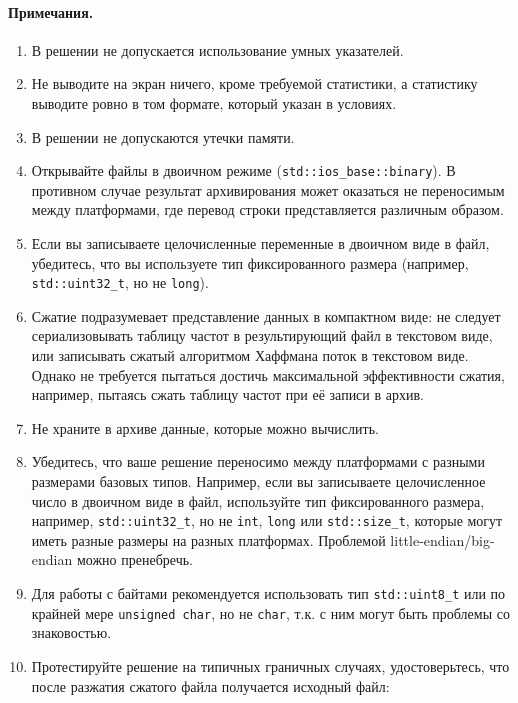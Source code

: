 \documentclass[a4paper,10pt]{article}
\begin{document}
\paragraph{Примечания.}
\begin{enumerate}
    \item В решении не допускается использование умных указателей.
    \item Не выводите на экран ничего, кроме требуемой статистики,
        а статистику выводите ровно в том формате, который указан в условиях.
    \item В решении не допускаются утечки памяти.
    \item Открывайте файлы в двоичном режиме ({\tt std::ios_base::binary}).
        В противном случае результат архивирования может оказаться не переносимым между платформами,
        где перевод строки представляется различным образом.
    \item Если вы записываете целочисленные переменные в двоичном виде в файл, убедитесь,
        что вы используете тип фиксированного размера (например, {\tt std::uint32_t}, но не {\tt long}).
    \item Сжатие подразумевает представление данных в компактном виде:
        не следует сериализовывать таблицу частот в результирующий файл в текстовом виде,
        или записывать сжатый алгоритмом Хаффмана поток в текстовом виде.
        Однако не требуется пытаться достичь максимальной эффективности сжатия, например,
        пытаясь сжать таблицу частот при её записи в архив.
    \item Не храните в архиве данные, которые можно вычислить.
    \item Убедитесь, что ваше решение переносимо между платформами с разными размерами базовых типов.
        Например, если вы записываете целочисленное число в двоичном виде в файл,
        используйте тип фиксированного размера, например, {\tt std::uint32_t},
        но не {\tt int}, {\tt long} или {\tt std::size_t}, которые могут иметь разные размеры на разных платформах.
        Проблемой little-endian/big-endian можно пренебречь.
    \item Для работы с байтами рекомендуется использовать тип {\tt std::uint8_t} или по крайней мере {\tt unsigned char},
        но не {\tt char}, т.к. с ним могут быть проблемы со знаковостью.
    \item Протестируйте решение на типичных граничных случаях, удостоверьтесь,
        что после разжатия сжатого файла получается исходный файл:
        \begin{enumerate}

\end{enumerate}
\end{enumerate}
\end{document}
